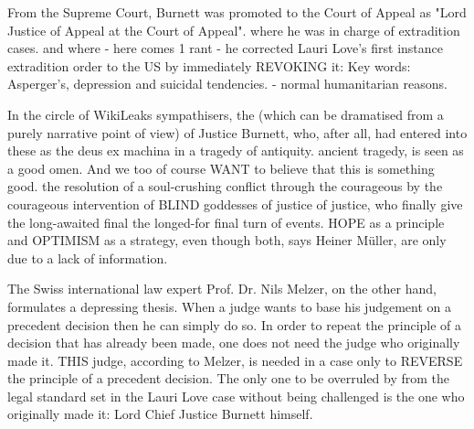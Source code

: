 \begin{multicols}{2}
From the Supreme Court, Burnett was promoted to the Court of Appeal as "Lord Justice of Appeal at the Court of Appeal".
where he was in charge of extradition cases.
and where - here comes 1 rant - he corrected Lauri Love's first instance extradition order to the US by immediately REVOKING it:
Key words: Asperger's, depression and suicidal tendencies.
- normal humanitarian reasons.

In the circle of WikiLeaks sympathisers, the
(which can be dramatised from a purely narrative point of view)
of Justice Burnett, who, after all, had entered into these
as the deus ex machina in a tragedy of antiquity.
ancient tragedy, is seen as a good omen. And we too
of course WANT to believe that this is something good.
the resolution of a soul-crushing conflict through the courageous
by the courageous intervention of BLIND goddesses of justice
of justice, who finally give the long-awaited final
the longed-for final turn of events. HOPE as a principle
and OPTIMISM as a strategy, even though both, says
Heiner Müller, are only due to a lack of information.

The Swiss international law expert Prof. Dr. Nils Melzer, on the other hand, formulates a depressing thesis. When a
judge wants to base his judgement on a precedent decision
then he can simply do so. 
In order to repeat the principle of a decision that has already been made, one does not need the judge who originally made it. THIS judge, according to Melzer, is needed
in a case only to REVERSE the principle of a precedent decision. The only one to be overruled by
from the legal standard set in the Lauri Love case without being challenged is the one who originally
made it: Lord Chief Justice Burnett himself.




\end{multicols}
